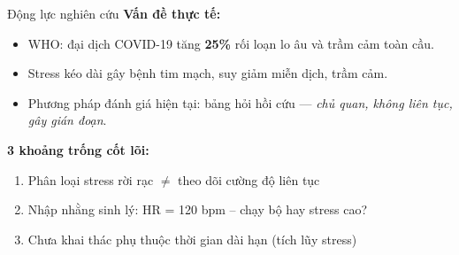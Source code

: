 \documentclass[11pt]{beamer}
\begin{document}
\begin{frame}{Động lực nghiên cứu}
\small
\textbf{Vấn đề thực tế:}
\begin{itemize}
    \item WHO: đại dịch COVID-19 tăng \textbf{25\%} rối loạn lo âu và trầm cảm toàn cầu.
    \item Stress kéo dài gây bệnh tim mạch, suy giảm miễn dịch, trầm cảm.
    \item Phương pháp đánh giá hiện tại: bảng hỏi hồi cứu — \textit{chủ quan, không liên tục, gây gián đoạn}.
\end{itemize}

\vspace{0.15cm}
\textbf{3 khoảng trống cốt lõi:}
\begin{enumerate}
    \item Phân loại stress rời rạc $\neq$ theo dõi cường độ liên tục
    \item \textcolor{alertred}{Nhập nhằng sinh lý}: HR = 120 bpm -- chạy bộ hay stress cao?
    \item Chưa khai thác phụ thuộc thời gian dài hạn (tích lũy stress)
\end{enumerate}

\vspace{0.1cm}
\end{frame}
\end{document}
